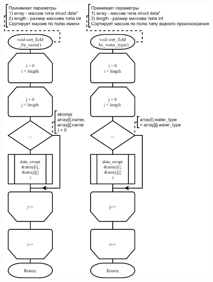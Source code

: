 \begin{figure}[!htp]
    \includegraphics{../../Makefile-project/src/submenu/sort_elements/sort_elements-3.png}
\end{figure}


